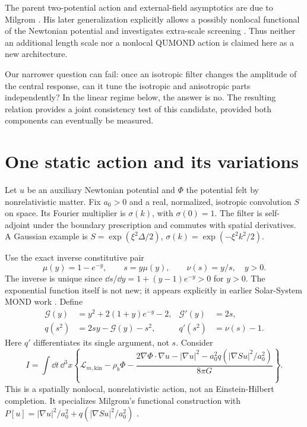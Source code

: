 \documentclass[11pt,letterpaper]{article}
\begin{document}
The parent two-potential action and external-field asymptotics are due to
Milgrom \cite{qumond}. His later generalization explicitly allows a possibly
nonlocal functional of the Newtonian potential and investigates extra-scale
screening \cite{gqumond}. Thus neither an additional length scale nor a nonlocal
QUMOND action is claimed here as a new architecture.

Our narrower question can fail: once an isotropic filter changes the amplitude
of the central response, can it tune the isotropic and anisotropic parts
independently? In the linear regime below, the answer is no. The resulting
relation provides a joint consistency test of this candidate, provided both
components can eventually be measured.

\newpage
\section{One static action and its variations}
Let $u$ be an auxiliary Newtonian potential and $\Phi$ the potential felt by
nonrelativistic matter. Fix $a_0>0$ and a real, normalized, isotropic convolution
$S$ on space. Its Fourier multiplier is $\sigma(k)$, with $\sigma(0)=1$.
The filter is self-adjoint under the boundary prescription and commutes
with spatial derivatives. A Gaussian example is
$S=\exp(\xi^2\Delta/2)$, $\sigma(k)=\exp(-\xi^2k^2/2)$.

Use the exact inverse constitutive pair
\begin{equation}
 \mu(y)=1-e^{-y},\qquad s=y\mu(y),\qquad \nu(s)=y/s,\quad y>0.
 \label{eq:pair}
\end{equation}
The inverse is unique since $\dd s/\dd y=1+(y-1)e^{-y}>0$ for $y>0$.
The exponential function itself is not new; it appears explicitly in
earlier Solar-System MOND work \cite{hees}. Define
\begin{align}
 \mathcal G(y)&=y^2+2(1+y)e^{-y}-2, & \mathcal G'(y)&=2s,\\
 q(s^2)&=2sy-\mathcal G(y)-s^2, & q'(s^2)&=\nu(s)-1.
 \label{eq:primitive}
\end{align}
Here $q'$ differentiates its single argument, not $s$. Consider
\begin{equation}
 I=\int\dd t\,\dd^3x\left\{\mathcal L_{m,\mathrm{kin}}-\rho_b\Phi
 -\frac{2\nabla\Phi\cdot\nabla u-|\nabla u|^2
 -a_0^2q\!\left(|\nabla Su|^2/a_0^2\right)}{8\pi G}\right\}.
 \label{eq:action}
\end{equation}
This is a spatially nonlocal, nonrelativistic action, not an Einstein-Hilbert
completion. It specializes Milgrom's functional construction with
$P[u]=|\nabla u|^2/a_0^2+q(|\nabla Su|^2/a_0^2)$ \cite{gqumond}.
\end{document}
